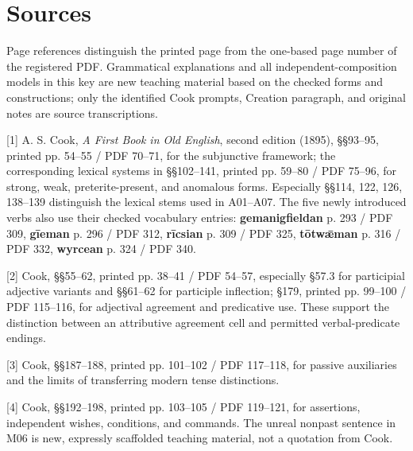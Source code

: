 \clearpage
\section*{Sources}

\begingroup\fontsize{10}{12.8}\selectfont
Page references distinguish the printed page from the one-based page number of the registered PDF. Grammatical explanations and all independent-composition models in this key are new teaching material based on the checked forms and constructions; only the identified Cook prompts, Creation paragraph, and original notes are source transcriptions.

[1] A. S. Cook, \emph{A First Book in Old English}, second edition (1895), §§93–95, printed pp. 54–55 /\allowbreak{} PDF 70–71, for the subjunctive framework; the corresponding lexical systems in §§102–141, printed pp. 59–80 /\allowbreak{} PDF 75–96, for strong, weak, preterite-present, and anomalous forms. Especially §§114, 122, 126, 138–139 distinguish the lexical stems used in A01–A07. The five newly introduced verbs also use their checked vocabulary entries: \textbf{gemanigfieldan} p. 293 /\allowbreak{} PDF 309, \textbf{gīeman} p. 296 /\allowbreak{} PDF 312, \textbf{rīcsian} p. 309 /\allowbreak{} PDF 325, \textbf{tōtwǣman} p. 316 /\allowbreak{} PDF 332, \textbf{wyrcean} p. 324 /\allowbreak{} PDF 340.

[2] Cook, §§55–62, printed pp. 38–41 /\allowbreak{} PDF 54–57, especially §57.3 for participial adjective variants and §§61–62 for participle inflection; §179, printed pp. 99–100 /\allowbreak{} PDF 115–116, for adjectival agreement and predicative use. These support the distinction between an attributive agreement cell and permitted verbal-predicate endings.

[3] Cook, §§187–188, printed pp. 101–102 /\allowbreak{} PDF 117–118, for passive auxiliaries and the limits of transferring modern tense distinctions.

[4] Cook, §§192–198, printed pp. 103–105 /\allowbreak{} PDF 119–121, for assertions, independent wishes, conditions, and commands. The unreal nonpast sentence in M06 is new, expressly scaffolded teaching material, not a quotation from Cook.

